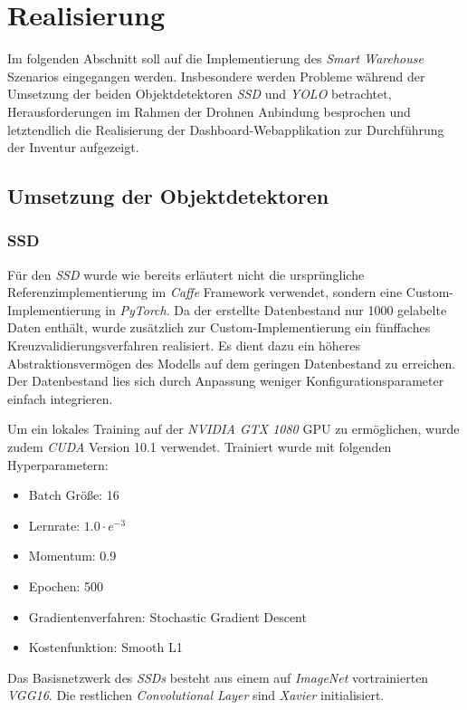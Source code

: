 \chapter{Realisierung}

Im folgenden Abschnitt soll auf die Implementierung des \textit{Smart Warehouse} Szenarios eingegangen werden. Insbesondere werden Probleme während der Umsetzung der beiden Objektdetektoren \textit{SSD} und \textit{YOLO} betrachtet, Herausforderungen im Rahmen der Drohnen Anbindung besprochen und letztendlich die Realisierung der Dashboard-Webapplikation zur Durchführung der Inventur aufgezeigt. 

\section{Umsetzung der Objektdetektoren}

\subsection*{SSD}

Für den \textit{SSD} wurde wie bereits erläutert nicht die ursprüngliche Referenzimplementierung im \textit{Caffe} Framework verwendet, sondern eine Custom-Implementierung in \textit{PyTorch}. Da der erstellte Datenbestand nur 1000 gelabelte Daten enthält, wurde zusätzlich zur Custom-Implementierung ein fünffaches Kreuzvalidierungsverfahren realisiert. Es dient dazu ein höheres Abstraktionsvermögen des Modells auf dem geringen Datenbestand zu erreichen. Der Datenbestand lies sich durch Anpassung weniger Konfigurationsparameter einfach integrieren.

Um ein lokales Training auf der \textit{NVIDIA GTX 1080} GPU zu ermöglichen, wurde zudem \textit{CUDA} Version 10.1 verwendet. Trainiert wurde mit folgenden Hyperparametern:
\begin{itemize}
	\item Batch Größe: 16
	\item Lernrate: $1.0\cdot e^{-3}$
	\item Momentum: 0.9
	\item Epochen: 500
	\item Gradientenverfahren: Stochastic Gradient Descent
	\item Kostenfunktion: Smooth L1
\end{itemize}

Das Basisnetzwerk des \textit{SSDs} besteht aus einem auf \textit{ImageNet} vortrainierten \textit{VGG16}. Die restlichen \textit{Convolutional Layer} sind \textit{Xavier} initialisiert. 

